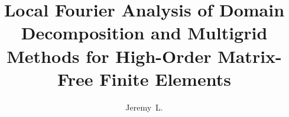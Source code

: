 \documentclass[defaultstyle,11pt]{thesis}
\title{Local Fourier Analysis of Domain Decomposition and Multigrid Methods for High-Order Matrix-Free Finite Elements}
\author{Jeremy~L.}{Thompson}
\begin{document}








\nocite{*}                          %

%
%
\end{document}
